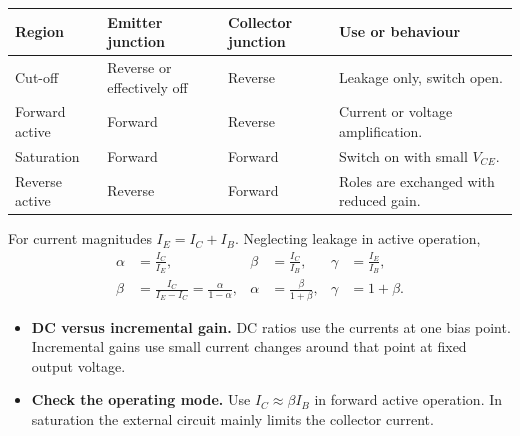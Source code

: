 \documentclass[12pt,a4paper]{article}
\begin{document}
\begin{tcolorbox}[tikzbox,title={NPN and PNP transistor symbols},unbreakable]
\centering
{}
\end{tcolorbox}

\par\vspace{6pt}\noindent
\begin{tabularx}{\linewidth}{|B{3.3cm}|Y|Y|Y|}\hline
Region & \textbf{Emitter junction} & \textbf{Collector junction} & \textbf{Use or behaviour} \\ \hline
Cut-off & Reverse or effectively off & Reverse & Leakage only, switch open. \\ \hline
Forward active & Forward & Reverse & Current or voltage amplification. \\ \hline
Saturation & Forward & Forward & Switch on with small \(V_{CE}\). \\ \hline
Reverse active & Reverse & Forward & Roles are exchanged with reduced gain. \\ \hline
\end{tabularx}

For current magnitudes \(I_E=I_C+I_B\). Neglecting leakage in active operation,
\[
\begin{aligned}
\alpha&=\frac{I_C}{I_E},&
\beta&=\frac{I_C}{I_B},&
\gamma&=\frac{I_E}{I_B},\\
\beta&=\frac{I_C}{I_E-I_C}
      =\frac{\alpha}{1-\alpha},&
\alpha&=\frac{\beta}{1+\beta},&
\gamma&=1+\beta .
\end{aligned}
\]
\begin{itemize}[leftmargin=*, itemsep=3pt, topsep=4pt]
  \item \textbf{DC versus incremental gain.} DC ratios use the currents at one bias point. Incremental gains use small current changes around that point at fixed output voltage.
  \item \textbf{Check the operating mode.} Use \(I_C\approx\beta I_B\) in forward active operation. In saturation the external circuit mainly limits the collector current.
\end{itemize}
\end{document}
